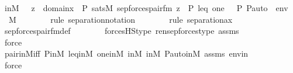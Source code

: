 \begin{isabellebody}
\ inM\ {\isacharcolon}{\kern0pt}\ {\isachardoublequoteopen}{\isacharbraceleft}{\kern0pt}\ z\ {\isasymin}\ domain{\isacharparenleft}{\kern0pt}x{\isacharparenright}{\kern0pt}\ {\isasymtimes}\ P{\isachardot}{\kern0pt}\ sats{\isacharparenleft}{\kern0pt}M{\isacharcomma}{\kern0pt}\ sep{\isacharunderscore}{\kern0pt}forces{\isacharunderscore}{\kern0pt}pair{\isacharunderscore}{\kern0pt}fm{\isacharparenleft}{\kern0pt}{\isasymphi}{\isacharparenright}{\kern0pt}{\isacharcomma}{\kern0pt}\ {\isacharbrackleft}{\kern0pt}z{\isacharbrackright}{\kern0pt}\ {\isacharat}{\kern0pt}\ {\isacharbrackleft}{\kern0pt}P{\isacharcomma}{\kern0pt}\ leq{\isacharcomma}{\kern0pt}\ one{\isacharcomma}{\kern0pt}\ {\isacharless}{\kern0pt}{\isasymF}{\isacharcomma}{\kern0pt}\ {\isasymG}{\isacharcomma}{\kern0pt}\ P{\isacharcomma}{\kern0pt}\ P{\isacharunderscore}{\kern0pt}auto{\isachargreater}{\kern0pt}{\isacharbrackright}{\kern0pt}\ {\isacharat}{\kern0pt}\ env{\isacharparenright}{\kern0pt}\ {\isacharbraceright}{\kern0pt}\ {\isasymin}\ M{\isachardoublequoteclose}\ \isanewline
\ \ \ \ \ \ \isamarkupfalse%
{\isacharparenleft}{\kern0pt}rule\ separation{\isacharunderscore}{\kern0pt}notation{\isacharparenright}{\kern0pt}\isanewline
\ \ \ \ \ \ \ \isamarkupfalse%
{\isacharparenleft}{\kern0pt}rule\ separation{\isacharunderscore}{\kern0pt}ax{\isacharparenright}{\kern0pt}\isanewline
\ \ \ \ \ \ \isamarkupfalse%
\ sep{\isacharunderscore}{\kern0pt}forces{\isacharunderscore}{\kern0pt}pair{\isacharunderscore}{\kern0pt}fm{\isacharunderscore}{\kern0pt}def\isanewline
\ \ \ \ \ \ \isamarkupfalse%
\ forcesHS{\isacharunderscore}{\kern0pt}type\ ren{\isacharunderscore}{\kern0pt}sep{\isacharunderscore}{\kern0pt}forces{\isacharunderscore}{\kern0pt}type\ assms\ \isanewline
\ \ \ \ \ \ \ \ \ \isamarkupfalse%
\ force\ \isanewline
\ \ \ \ \ \ \isamarkupfalse%
\ pair{\isacharunderscore}{\kern0pt}in{\isacharunderscore}{\kern0pt}M{\isacharunderscore}{\kern0pt}iff\ P{\isacharunderscore}{\kern0pt}in{\isacharunderscore}{\kern0pt}M\ leq{\isacharunderscore}{\kern0pt}in{\isacharunderscore}{\kern0pt}M\ one{\isacharunderscore}{\kern0pt}in{\isacharunderscore}{\kern0pt}M\ {\isasymF}{\isacharunderscore}{\kern0pt}in{\isacharunderscore}{\kern0pt}M\ {\isasymG}{\isacharunderscore}{\kern0pt}in{\isacharunderscore}{\kern0pt}M\ P{\isacharunderscore}{\kern0pt}auto{\isacharunderscore}{\kern0pt}in{\isacharunderscore}{\kern0pt}M\ assms\ envin\ \isanewline
\ \ \ \ \ \ \ \ \isamarkupfalse%
\ force\ \isanewline
\ \ \ \ \ \ \ \isamarkupfalse%

\end{isabellebody}
